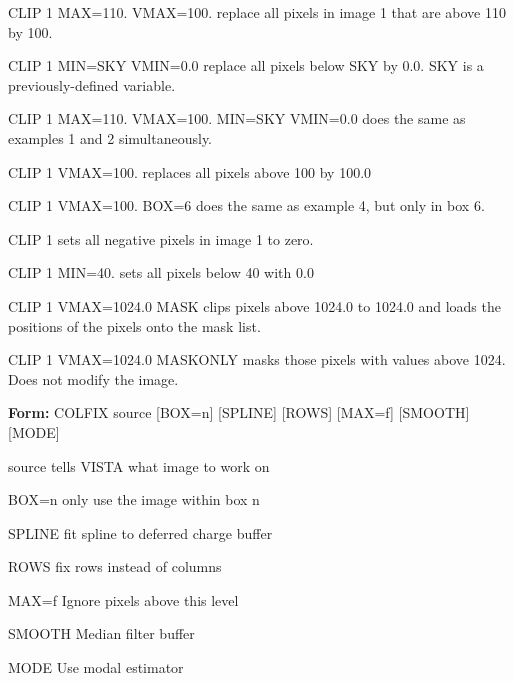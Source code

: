 {\newpage\clearpage
{}%
\begin{example}
  \item[CLIP 1 MAX=110. VMAX=100.\hfill]{replace all pixels in image 1
       that are above 110 by 100.}
  \item[CLIP 1 MIN=SKY VMIN=0.0\hfill]{replace all pixels below SKY
       by 0.0.  SKY is a previously-defined variable.}
  \item[CLIP 1 MAX=110. VMAX=100. MIN=SKY VMIN=0.0\hfill]{
       does the same as examples 1 and 2 simultaneously.}
  \item[CLIP 1 VMAX=100.\hfill]{replaces all pixels above 100 by 100.0}
  \item[CLIP 1 VMAX=100. BOX=6\hfill]{does the same as example 4,
       but only in box 6.}
  \item[CLIP 1\hfill]{sets all negative pixels in image 1 to zero.}
  \item[CLIP 1 MIN=40.\hfill]{sets all pixels below 40 with 0.0}
  \item[CLIP 1 VMAX=1024.0 MASK\hfill]{clips pixels above 1024.0 to
       1024.0 and loads the positions of the pixels onto the mask list.}
  \item[CLIP 1 VMAX=1024.0 MASKONLY\hfill]{masks those pixels with values
       above 1024.  Does not modify the image.}
\end{example}%
\lthtmlfigureZ
\lthtmlcheckvsize\clearpage}

{\newpage\clearpage
{}%
\begin{command}
  \item[\textbf{Form: }  COLFIX source {[BOX=n]} {[SPLINE]} {[ROWS]} 
       {[MAX=f]} {[SMOOTH]} {[MODE]}\hfill]{}
  \item[source]{tells VISTA what image to work on}
  \item[BOX=n]{only use the image within box n}
  \item[SPLINE]{fit spline to deferred charge buffer}
  \item[ROWS]{fix rows instead of columns}
  \item[MAX=f]{Ignore pixels above this level}
  \item[SMOOTH]{Median filter buffer}
  \item[MODE]{Use modal estimator}
\end{command}%
\lthtmlfigureZ
\lthtmlcheckvsize\clearpage}

